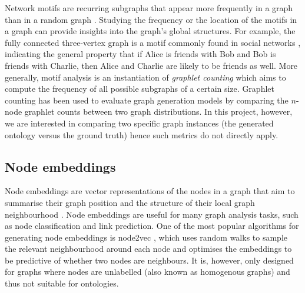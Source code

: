 Network motifs are recurring subgraphs that appear more frequently in a graph than in a random graph \cite{milo2002network}. Studying the frequency or the location of the motifs in a graph can provide insights into the graph's global structures. For example, the fully connected three-vertex graph is a motif commonly found in social networks \cite{stone2019network}, indicating the general property that if Alice is friends with Bob and Bob is friends with Charlie, then Alice and Charlie are likely to be friends as well. More generally, motif analysis is an instantiation of \emph{graphlet counting} \cite{ribeiro2021survey} which aims to compute the frequency of all possible subgraphs of a certain size. Graphlet counting has been used to evaluate graph generation models \cite{you2018graphrnn} by comparing the $n$-node graphlet counts between two graph distributions. In this project, however, we are interested in comparing two specific graph instances (the generated ontology versus the ground truth) hence such metrics do not directly apply.

\subsection{Node embeddings}  \label{sec:node-embeddings}

Node embeddings are vector representations of the nodes in a graph that aim to summarise their graph position and the structure of their local graph neighbourhood \cite{hamilton2020graph}. Node embeddings are useful for many graph analysis tasks, such as node classification and link prediction. One of the most popular algorithms for generating node embeddings is node2vec \cite{grover2016node2vec}, which uses random walks to sample the relevant neighbourhood around each node and optimises the embeddings to be predictive of whether two nodes are neighbours. It is, however, only designed for graphs where nodes are unlabelled (also known as homogenous graphs) and thus not suitable for ontologies.

